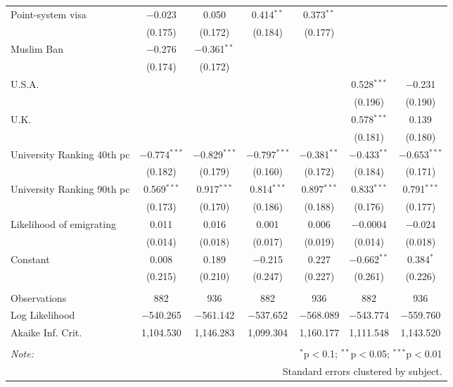 \begin{sidewaystable}[!htbp]
\begin{tabular}{@{\extracolsep{5pt}}lcccccc}
  Point-system visa & $-$0.023 & 0.050 & 0.414$^{**}$ & 0.373$^{**}$ &  &  \\ 
  & (0.175) & (0.172) & (0.184) & (0.177) &  &  \\ 
  Muslim Ban & $-$0.276 & $-$0.361$^{**}$ &  &  &  &  \\ 
  & (0.174) & (0.172) &  &  &  &  \\ 
  U.S.A. &  &  &  &  & 0.528$^{***}$ & $-$0.231 \\ 
  &  &  &  &  & (0.196) & (0.190) \\ 
  U.K. &  &  &  &  & 0.578$^{***}$ & 0.139 \\ 
  &  &  &  &  & (0.181) & (0.180) \\ 
  University Ranking 40th pc & $-$0.774$^{***}$ & $-$0.829$^{***}$ & $-$0.797$^{***}$ & $-$0.381$^{**}$ & $-$0.433$^{**}$ & $-$0.653$^{***}$ \\ 
  & (0.182) & (0.179) & (0.160) & (0.172) & (0.184) & (0.171) \\ 
  University Ranking 90th pc & 0.569$^{***}$ & 0.917$^{***}$ & 0.814$^{***}$ & 0.897$^{***}$ & 0.833$^{***}$ & 0.791$^{***}$ \\ 
  & (0.173) & (0.170) & (0.186) & (0.188) & (0.176) & (0.177) \\ 
  Likelihood of emigrating & 0.011 & 0.016 & 0.001 & 0.006 & $-$0.0004 & $-$0.024 \\ 
  & (0.014) & (0.018) & (0.017) & (0.019) & (0.014) & (0.018) \\ 
  Constant & 0.008 & 0.189 & $-$0.215 & 0.227 & $-$0.662$^{**}$ & 0.384$^{*}$ \\ 
  & (0.215) & (0.210) & (0.247) & (0.227) & (0.261) & (0.226) \\ 
 \hline \\[-1.8ex] 
Observations & 882 & 936 & 882 & 936 & 882 & 936 \\ 
Log Likelihood & $-$540.265 & $-$561.142 & $-$537.652 & $-$568.089 & $-$543.774 & $-$559.760 \\ 
Akaike Inf. Crit. & 1,104.530 & 1,146.283 & 1,099.304 & 1,160.177 & 1,111.548 & 1,143.520 \\ 
\hline 
\hline \\[-1.8ex] 
\textit{Note:}  & \multicolumn{6}{r}{$^{*}$p$<$0.1; $^{**}$p$<$0.05; $^{***}$p$<$0.01} \\ 
 & \multicolumn{6}{r}{Standard errors clustered by subject.} \\ 
\end{tabular} 
\end{sidewaystable} 
